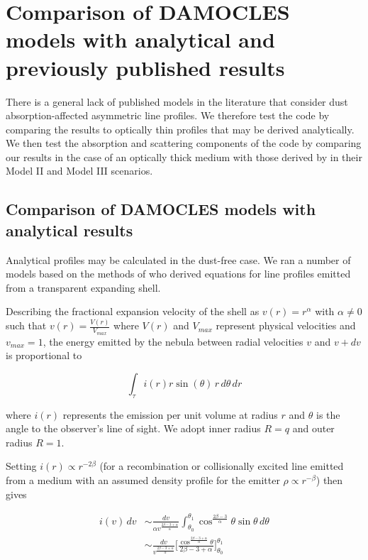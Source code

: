 \documentclass[useAMS,usenatbib,usegraphicx]{mnras}
\begin{document}
\section{Comparison of DAMOCLES models with analytical and previously published results}
\label{params}

There is a general lack of published models in the literature that 
consider dust absorption-affected asymmetric line profiles.  We therefore test 
the code by comparing the results to optically thin profiles that may be 
derived analytically.  We then test the absorption and scattering 
components of the code by comparing our results in the case of an 
optically thick medium with those derived by \citet{Lucy1989} in their 
Model II and Model III scenarios.

\subsection{Comparison of DAMOCLES models with analytical results}
\label{analytics}

Analytical profiles may be calculated in the dust-free case.  We ran a 
number of models based on the methods of \cite{Gerasimovic1933} 
who derived equations for line profiles emitted from a transparent 
expanding shell.

Describing the fractional expansion velocity of the shell as $v(r)=r^\alpha$ with 
$\alpha \neq 0$ such that $v(r)=\frac{V(r)}{V_{max}}$ where $V(r)$ and $V_{max}$ represent physical velocities and $v_{max}=1$, the energy emitted by 
the nebula between radial velocities $v$ and $v+dv$ is proportional to

\begin{equation}
\int _\tau i(r) r \sin (\theta) \, r \, d\theta \, dr
\end{equation}

\noindent where $i(r)$ represents the emission per unit volume at radius 
$r$ and $\theta$ is the angle to the observer's line of sight.  We adopt inner radius $R=q$ and outer radius $R=1$.


Setting $i(r) \propto r^{-2\beta}$ (for a recombination or collisionally excited line emitted from 
a medium with an assumed density profile for the emitter $\rho \propto 
r^{-\beta}$) then gives

\begin{equation}
\begin{split}
i(v) \, dv &\sim \frac{dv}{\alpha v^{\frac{2\beta-3+\alpha}{\alpha}}} \int^{\theta_1}_{\theta_0} \cos^{\frac{2\beta-3}{\alpha}} \theta \sin \theta \, d\theta 
\\
&\sim  \frac{dv}{v^{\frac{2\beta-3+\alpha}{\alpha}}} \Bigg[\frac{\cos^{\frac{2\beta - 3 + \alpha}{\alpha}} \theta}{2\beta -3 + \alpha}\Bigg]^{\theta_1}_{\theta_0}
\end{split}
\end{equation}
\end{document}
